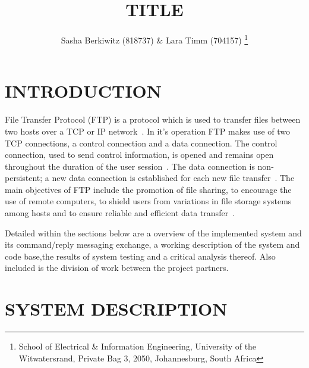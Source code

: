 \documentclass[10pt,twocolumn]{witseiepaper}
\begin{document}
\title{TITLE}

\author{Sasha Berkiwitz (818737) \& Lara Timm (704157)
\thanks{School of Electrical \& Information Engineering, University of the
Witwatersrand, Private Bag 3, 2050, Johannesburg, South Africa}
}


%
\abstract{}

\keywords{}

\maketitle
\pagestyle{plain}
\setcounter{page}{1}


\section{INTRODUCTION}

File Transfer Protocol (FTP) is a protocol which is used  to transfer files between two hosts over a TCP or IP network~\cite{FTPbeginners}. In it's operation FTP makes use of two TCP connections, a control connection and a data connection. The control connection, used to send control information, is opened and remains open throughout the duration of the user session~\cite{topDownApproach6th}. The data connection is non-persistent; a new data connection is established for each new file transfer~\cite{topDownApproach6th}. The main objectives of FTP include the promotion of file sharing, to encourage the use of remote computers, to shield users from variations in file storage systems among hosts and to ensure reliable and efficient data transfer~\cite{rfc959}. 


Detailed within the sections below are a overview of the implemented system and its command/reply messaging exchange, a working description of the system and code base,the results of system testing and a critical analysis thereof. Also included is the division of work between the project partners.

\section{SYSTEM DESCRIPTION} %
\end{document}
